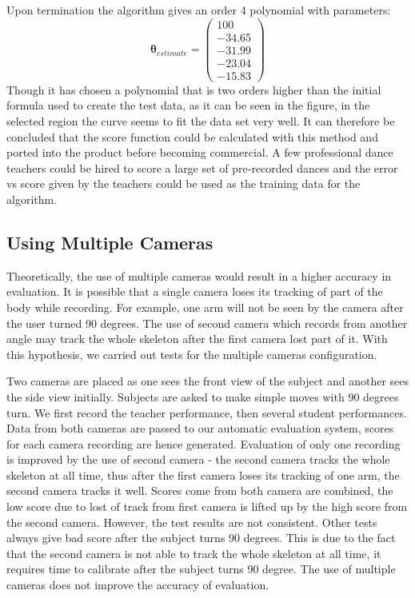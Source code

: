 \documentclass[11pt,a4paper]{article}
\begin{document}
\noindent 
Upon termination the algorithm gives an order 4 polynomial with parameters:
\begin{equation}
\boldsymbol \theta_{estimate} = 
\begin{pmatrix}
100\\
-34.65\\
-31.99\\
-23.04\\
-15.83
\end{pmatrix}
\end{equation}
\noindent 
Though it has chosen a polynomial that is two orders higher than the initial formula used to create the test data, as it can be seen in the figure, in the selected region the curve seems to fit the data set very well. It can therefore be concluded that the score function could be calculated with this method and ported into the product before becoming commercial. A few professional dance teachers could be hired to score a large set of pre-recorded dances and the error vs score given by the teachers could be used as the training data for the algorithm. 


\subsection{Using Multiple Cameras}
Theoretically, the use of multiple cameras would result in a higher accuracy in evaluation. It is possible that a single camera loses its tracking of part of the body while recording. For example, one arm will not be seen by the camera after the user turned 90 degrees. The use of second camera which records from another angle may track the whole skeleton after the first camera lost part of it. With this hypothesis, we carried out tests for the multiple cameras configuration.

\noindent
Two cameras are placed as one sees the front view of the subject and another sees the side view initially. Subjects are asked to make simple moves with 90 degrees turn. We first record the teacher performance, then several student performances. Data from both cameras are passed to our automatic evaluation system, scores for each camera recording are hence generated. Evaluation of only one recording is improved by the use of second camera - the second camera tracks the whole skeleton at all time, thus after the first camera loses its tracking of one arm, the second camera tracks it well. Scores come from both camera are combined, the low score due to lost of track from first camera is lifted up by the high score from the second camera. However, the test results are not consistent. Other tests always give bad score after the subject turns 90 degrees. This is due to the fact that the second camera is not able to track the whole skeleton at all time, it requires time to calibrate after the subject turns 90 degree. The use of multiple cameras does not improve the accuracy of evaluation.
\end{document}
